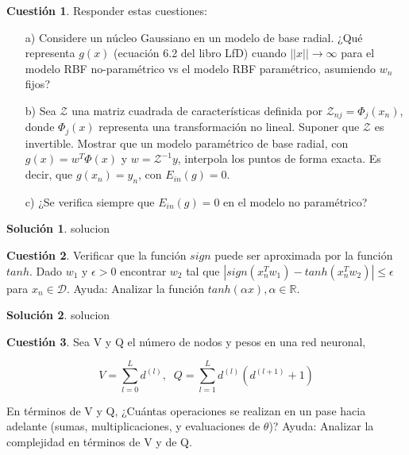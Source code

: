 \documentclass[a4paper, 11pt]{article}
\theoremstyle{definition}
\newtheorem{cuestion}{Cuestión}
\newtheorem*{solucion}{Solución}
\begin{document}
  \begin{cuestion}
    Responder estas cuestiones:
    \begin{enumerate}
      \item[a)] Considere un núcleo Gaussiano en un modelo de base radial. ¿Qué representa $g(x)$ (ecuación 6.2 del libro LfD) cuando $||x|| \rightarrow \infty$ para el modelo RBF no-paramétrico vs el modelo RBF paramétrico, asumiendo $w_n$ fijos?
      \item[b)] Sea $\mathcal{Z}$ una matriz cuadrada de características definida por $\mathcal{Z}_{nj}=\Phi_j(x_n)$, donde $\Phi_j(x)$ representa una transformación no lineal. Suponer que $\mathcal{Z}$ es invertible. Mostrar que un modelo paramétrico de base radial, con $g(x) = w^T\Phi(x)$ y $ w = \mathcal{Z}^{-1}y $, interpola los puntos de forma exacta. Es decir, que $g(x_n) = y_n$, con $E_{in}(g) = 0$.
      \item[c)] ¿Se verifica siempre que $E_{in}(g) = 0$ en el modelo no paramétrico?
    \end{enumerate}
  \end{cuestion}

  \begin{solucion}
    solucion
  \end{solucion}

  \begin{cuestion}
    Verificar que la función $sign$ puede ser aproximada por la función $tanh$. Dado $w_1$ y $\epsilon > 0$ encontrar $w_2$ tal que $|sign(x_n^Tw_1) - tanh(x_n^Tw_2)| \leq \epsilon$ para $x_n \in \mathcal{D}$. Ayuda: Analizar la función $tanh(\alpha x), \alpha \in \mathbb{R}$.
  \end{cuestion}

  \begin{solucion}
    solucion
  \end{solucion}

  \begin{cuestion}
    Sea V y Q el número de nodos y pesos en una red neuronal,

    $$ V = \sum_{l=0}^L d^{(l)}, \; \; Q = \sum_{l=1}^L d^{(l)} \left( d^{(l+1)} + 1\right) $$

    En términos de V y Q, ¿Cuántas operaciones se realizan en un pase hacia adelante (sumas, multiplicaciones, y evaluaciones de $\theta$)? Ayuda: Analizar la complejidad en términos de V y de Q.



  \end{cuestion}
\end{document}
